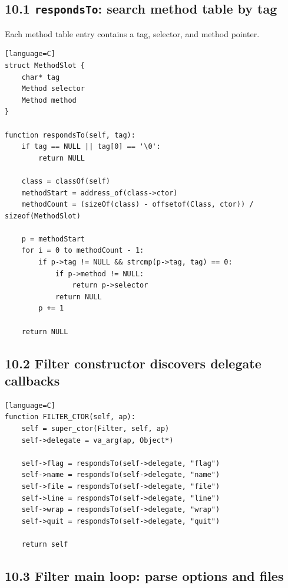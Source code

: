 \documentclass[11pt]{article}
\begin{document}
\subsection{\texorpdfstring{10.1 \texttt{respondsTo}: search method
table by
tag}{10.1 respondsTo: search method table by tag}}\label{respondsto-search-method-table-by-tag}

Each method table entry contains a tag, selector, and method pointer.

\begin{verbatim}[language=C]
struct MethodSlot {
    char* tag
    Method selector
    Method method
}

function respondsTo(self, tag):
    if tag == NULL || tag[0] == '\0':
        return NULL

    class = classOf(self)
    methodStart = address_of(class->ctor)
    methodCount = (sizeOf(class) - offsetof(Class, ctor)) / sizeof(MethodSlot)

    p = methodStart
    for i = 0 to methodCount - 1:
        if p->tag != NULL && strcmp(p->tag, tag) == 0:
            if p->method != NULL:
                return p->selector
            return NULL
        p += 1

    return NULL
\end{verbatim}

\subsection{10.2 Filter constructor discovers delegate
callbacks}\label{filter-constructor-discovers-delegate-callbacks}

\begin{verbatim}[language=C]
function FILTER_CTOR(self, ap):
    self = super_ctor(Filter, self, ap)
    self->delegate = va_arg(ap, Object*)

    self->flag = respondsTo(self->delegate, "flag")
    self->name = respondsTo(self->delegate, "name")
    self->file = respondsTo(self->delegate, "file")
    self->line = respondsTo(self->delegate, "line")
    self->wrap = respondsTo(self->delegate, "wrap")
    self->quit = respondsTo(self->delegate, "quit")

    return self
\end{verbatim}

\subsection{10.3 Filter main loop: parse options and
files}\label{filter-main-loop-parse-options-and-files}
\end{document}
